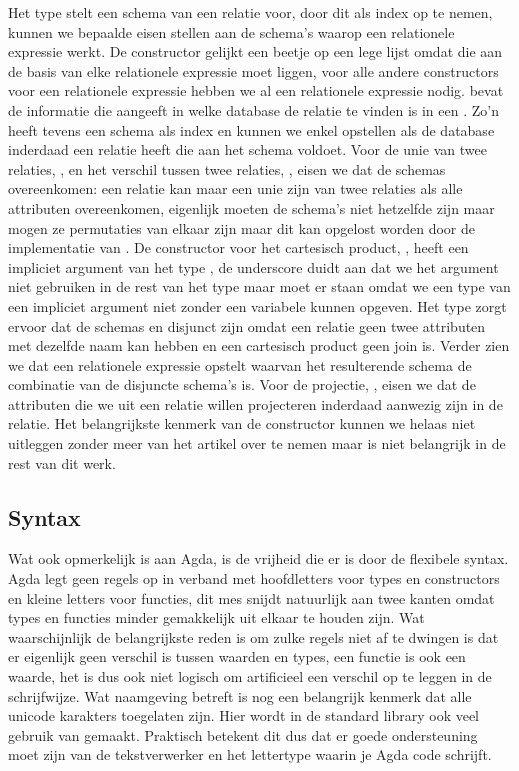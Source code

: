 Het type  stelt een schema van een relatie voor, door dit als
index op te nemen, kunnen we bepaalde eisen stellen aan de schema's waarop een
relationele expressie werkt. De  constructor gelijkt een beetje op
een lege lijst omdat die aan de basis van elke relationele expressie moet
liggen, voor alle andere constructors voor een relationele expressie hebben we
al een relationele expressie nodig.  bevat de informatie die
aangeeft in welke database de relatie te vinden is in een . Zo'n
 heeft tevens een schema als index en kunnen we enkel opstellen
als de database inderdaad een relatie heeft die aan het schema voldoet. Voor de
unie van twee relaties, , en het verschil tussen twee relaties,
, eisen we dat de schemas overeenkomen: een relatie kan maar een
unie zijn van twee relaties als alle attributen overeenkomen, eigenlijk moeten
de schema's niet hetzelfde zijn maar mogen ze permutaties van elkaar zijn maar
dit kan opgelost worden door de implementatie van . De
constructor voor het cartesisch product, , heeft een impliciet
argument van het type , de underscore duidt aan dat
we het argument niet gebruiken in de rest van het type maar moet er staan omdat
we een type van een impliciet argument niet zonder een variabele kunnen
opgeven. Het type  zorgt ervoor dat de schemas
 en  disjunct zijn omdat een relatie geen twee attributen
met dezelfde naam kan hebben en een cartesisch product geen join is. Verder
zien we dat  een relationele expressie opstelt waarvan het
resulterende schema de combinatie van de disjuncte schema's is. Voor de
projectie, , eisen we dat de attributen die we uit een relatie
willen projecteren inderdaad aanwezig zijn in de relatie. Het belangrijkste
kenmerk van de  constructor kunnen we helaas niet uitleggen
zonder meer van het artikel over te nemen maar is niet belangrijk in de rest
van dit werk.

\subsection{Syntax}

Wat ook opmerkelijk is aan Agda, is de vrijheid die er is door de flexibele
syntax. Agda legt geen regels op in verband met hoofdletters voor types en
constructors en kleine letters voor functies, dit mes snijdt natuurlijk aan
twee kanten omdat types en functies minder gemakkelijk uit elkaar te houden
zijn. Wat waarschijnlijk de belangrijkste reden is om zulke regels niet af te
dwingen is dat er eigenlijk geen verschil is tussen waarden en types, een
functie is ook een waarde, het is dus ook niet logisch om artificieel een
verschil op te leggen in de schrijfwijze. Wat naamgeving betreft is nog een
belangrijk kenmerk dat alle unicode karakters toegelaten zijn. Hier wordt in de
standard library ook veel gebruik van gemaakt. Praktisch betekent dit dus dat
er goede ondersteuning moet zijn van de tekstverwerker en het lettertype waarin
je Agda code schrijft.

